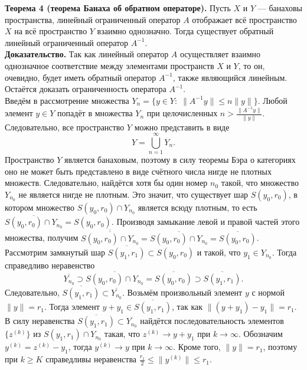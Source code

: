 \documentclass[12pt,a4paper, titlepage]{article}
\begin{document}
\textbf{Теорема 4 (теорема Банаха об обратном операторе).} Пусть $X$ и $Y$ --- банаховы пространства, линейный ограниченный оператор $A$ отображает всё пространство $X$ на всё пространство $Y$ взаимно однозначно. Тогда существует обратный линейный ограниченный оператор $A^{-1}$.\\
\textbf{Доказательство.} Так как линейный оператор $A$ осуществляет взаимно однозначное соответствие между элементами пространств $X$ и $Y$, то он, очевидно, будет иметь обратный оператор $A^{-1}$, также являющийся линейным. Остаётся доказать ограниченность оператора $A^{-1}$.\\

Введём в рассмотрение множества $Y_n = \{ y \in Y: \; \|A^{-1} y \| \leqslant n \|y\|\}$. Любой элемент $y \in Y$ попадёт в множества $Y_n$ при целочисленных $n > \frac {\|A^{-1}y\|} {\|y\|}$. Следовательно, все пространство $Y$ можно представить в виде
$$
Y = \bigcup_{n=1}^\infty Y_n.
$$
Пространство $Y$ является банаховым, поэтому в силу теоремы Бэра о категориях оно не может быть представлено в виде счётного числа нигде не плотных множеств. Следовательно, найдётся хотя бы один номер $n_0$ такой, что множество $Y_{n_0}$ не является нигде не плотным. Это значит, что существует шар $S(y_0, r_0)$, в котором множество $S(y_0, r_0) \cap Y_{n_0}$ является всюду плотным, то есть $\overline{S(y_0, r_0) \cap Y_{n_0}} = S(y_0, r_0)$. Производя замыкание левой и правой частей этого множества, получим $\overline{\overline{S(y_0, r_0) \cap Y_{n_0}}} = \overline{S(y_0, r_0) \cap Y_{n_0}} = \overline{S(y_0, r_0)}$.\\

Рассмотрим замкнутый шар $\overline{S(y_1, r_1)} \subset S(y_0, r_0)$ и такой, что $y_1 \in Y_{n_0}$. Тогда справедливо неравенство
$$
\overline{Y_{n_0}} \supset \overline{S(y_0, r_0) \cap Y_{n_0}} = \overline{S(y_0, r_0)} \supset \overline{S(y_1, r_1)}.
$$
Следовательно, $\overline{S(y_1, r_1)} \subset \overline{Y_{n_0}}$. Возьмём произвольный элемент $y$ с нормой $\|y\| = r_1$. Тогда элемент $y + y_1 \in \overline{S(y_1, r_1)}$, так как $\|(y + y_1) - y_1\| = r_1$. В силу неравенства $\overline{S(y_1, r_1)} \subset \overline{Y_{n_0}}$ найдётся последовательность элементов $\lbrace z^{(k)} \rbrace$ из $S(y_1, r_1) \cap Y_{n_0}$ такая, что $z^{(k)} \to y + y_1$ при $k \to \infty$. Обозначим $y^{(k)} = z^{(k)} - y_1$, тогда $y^{(k)} \to y$ при $k \to \infty$. Кроме того, $\|y\| = r_1$, поэтому при $k \geqslant K$ справедливы неравенства $\frac {r_1} 2 \leqslant \|y^{(k)}\| \leqslant r_1$.\\
\end{document}
